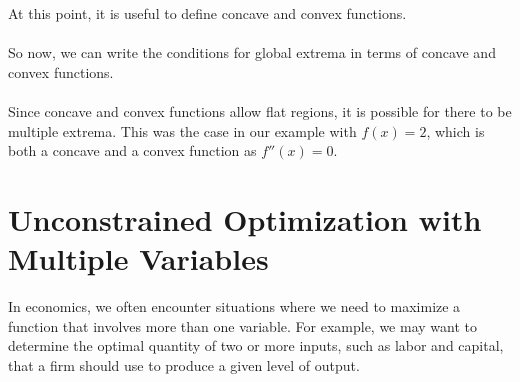 \documentclass{./../Latex/handout}
\begin{document}
At this point, it is useful to define concave and convex functions. \\

 \\

So now, we can write the conditions for global extrema in terms of concave and convex functions. \\

 \\

Since concave and convex functions allow flat regions, it is possible for there to be multiple extrema. This was the case in our example with $f(x)=2$, which is both a concave and a convex function as $f''(x)=0$. 


\section{Unconstrained Optimization with Multiple Variables}

In economics, we often encounter situations where we need to maximize a function that involves more than one variable. For example, we may want to determine the optimal quantity of two or more inputs, such as labor and capital, that a firm should use to produce a given level of output. 
\end{document}

